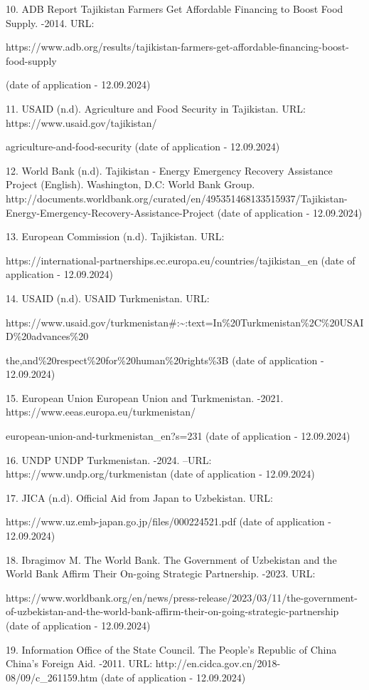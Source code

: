 \begin{noparindent}
10.
ADB Report Tajikistan Farmers Get Affordable Financing to Boost Food
Supply. -2014. URL:

https://www.adb.org/results/tajikistan-farmers-get-affordable-financing-boost-food-supply

(date of application - 12.09.2024)

11.
USAID (n.d). Agriculture and Food Security in Tajikistan. URL:
https://www.usaid.gov/tajikistan/

agriculture-and-food-security (date
of application - 12.09.2024)

12.
World Bank (n.d). Tajikistan - Energy Emergency Recovery Assistance
Project (English). Washington, D.C: World Bank Group.
http://documents.worldbank.org/curated/en/495351468133515937/Tajikistan-Energy-Emergency-Recovery-Assistance-Project
(date of application - 12.09.2024)

13.
European Commission (n.d). Tajikistan. URL:

https://international-partnerships.ec.europa.eu/countries/tajikistan\_en
(date of application - 12.09.2024)

14.
USAID (n.d). USAID Turkmenistan. URL:

https://www.usaid.gov/turkmenistan\#:\textasciitilde:text=In\%20Turkmenistan\%2C\%20USAID\%20advances\%20

the,and\%20respect\%20for\%20human\%20rights\%3B
(date of application - 12.09.2024)

15.
European Union European Union and Turkmenistan. -2021.
https://www.eeas.europa.eu/turkmenistan/

european-union-and-turkmenistan\_en?s=231
(date of application - 12.09.2024)

16.
UNDP UNDP Turkmenistan. -2024. --URL:
https://www.undp.org/turkmenistan (date of application - 12.09.2024)

17.
JICA (n.d). Official Aid from Japan to Uzbekistan. URL:

https://www.uz.emb-japan.go.jp/files/000224521.pdf (date of
application - 12.09.2024)

18.
Ibragimov M. The World Bank. The Government of Uzbekistan and the
World Bank Affirm Their On-going Strategic Partnership. -2023. URL:

https://www.worldbank.org/en/news/press-release/2023/03/11/the-government-of-uzbekistan-and-the-world-bank-affirm-their-on-going-strategic-partnership
(date of application - 12.09.2024)

19.
Information Office of the State Council. The People's Republic of
China China's Foreign Aid. -2011. URL:
http://en.cidca.gov.cn/2018-08/09/c\_261159.htm (date of application -
12.09.2024)


\end{noparindent}
